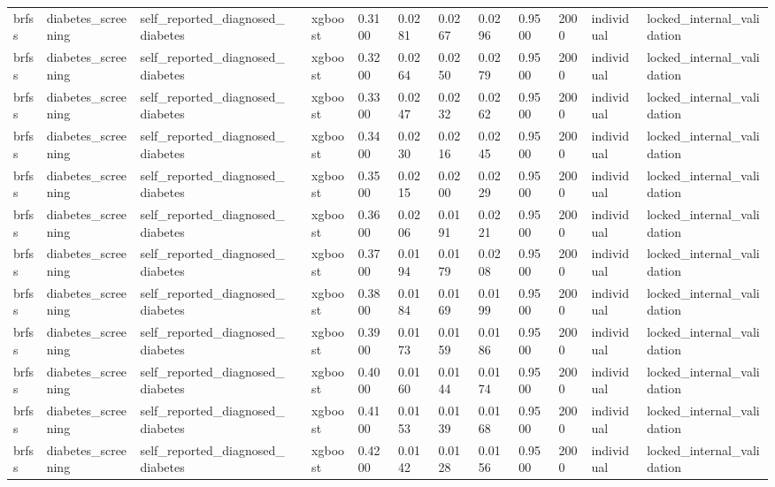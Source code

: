 \begin{tabular}{lllllllllllll}
brfss & diabetes\_screening & self\_reported\_diagnosed\_diabetes &  & xgboost & 0.3100 & 0.0281 & 0.0267 & 0.0296 & 0.9500 & 2000 & individual & locked\_internal\_validation \\
brfss & diabetes\_screening & self\_reported\_diagnosed\_diabetes &  & xgboost & 0.3200 & 0.0264 & 0.0250 & 0.0279 & 0.9500 & 2000 & individual & locked\_internal\_validation \\
brfss & diabetes\_screening & self\_reported\_diagnosed\_diabetes &  & xgboost & 0.3300 & 0.0247 & 0.0232 & 0.0262 & 0.9500 & 2000 & individual & locked\_internal\_validation \\
brfss & diabetes\_screening & self\_reported\_diagnosed\_diabetes &  & xgboost & 0.3400 & 0.0230 & 0.0216 & 0.0245 & 0.9500 & 2000 & individual & locked\_internal\_validation \\
brfss & diabetes\_screening & self\_reported\_diagnosed\_diabetes &  & xgboost & 0.3500 & 0.0215 & 0.0200 & 0.0229 & 0.9500 & 2000 & individual & locked\_internal\_validation \\
brfss & diabetes\_screening & self\_reported\_diagnosed\_diabetes &  & xgboost & 0.3600 & 0.0206 & 0.0191 & 0.0221 & 0.9500 & 2000 & individual & locked\_internal\_validation \\
brfss & diabetes\_screening & self\_reported\_diagnosed\_diabetes &  & xgboost & 0.3700 & 0.0194 & 0.0179 & 0.0208 & 0.9500 & 2000 & individual & locked\_internal\_validation \\
brfss & diabetes\_screening & self\_reported\_diagnosed\_diabetes &  & xgboost & 0.3800 & 0.0184 & 0.0169 & 0.0199 & 0.9500 & 2000 & individual & locked\_internal\_validation \\
brfss & diabetes\_screening & self\_reported\_diagnosed\_diabetes &  & xgboost & 0.3900 & 0.0173 & 0.0159 & 0.0186 & 0.9500 & 2000 & individual & locked\_internal\_validation \\
brfss & diabetes\_screening & self\_reported\_diagnosed\_diabetes &  & xgboost & 0.4000 & 0.0160 & 0.0144 & 0.0174 & 0.9500 & 2000 & individual & locked\_internal\_validation \\
brfss & diabetes\_screening & self\_reported\_diagnosed\_diabetes &  & xgboost & 0.4100 & 0.0153 & 0.0139 & 0.0168 & 0.9500 & 2000 & individual & locked\_internal\_validation \\
brfss & diabetes\_screening & self\_reported\_diagnosed\_diabetes &  & xgboost & 0.4200 & 0.0142 & 0.0128 & 0.0156 & 0.9500 & 2000 & individual & locked\_internal\_validation \\

\end{tabular}
